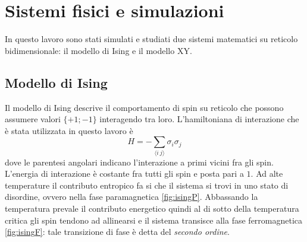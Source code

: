 \documentclass{article}
\begin{document}
\section{Sistemi fisici e simulazioni}
In questo lavoro sono stati simulati e studiati due sistemi matematici su reticolo bidimensionale:  il modello di Ising e il modello XY.
\subsection{Modello di Ising}
Il modello di Ising descrive il comportamento di spin su reticolo che possono assumere valori $\{+1;-1\}$ interagendo tra loro. L'hamiltoniana di interazione che è stata utilizzata in questo lavoro è
\begin{equation}
H=- \sum_{\langle i~j\rangle} \sigma_i\sigma_j
\end{equation} 
dove le parentesi angolari indicano l'interazione a primi vicini fra gli spin. L'energia di interazione è costante fra tutti gli spin e posta pari a $1$. Ad alte temperature il contributo entropico fa si che il sistema si trovi in uno stato di disordine, ovvero nella fase paramagnetica \ref{fig:isingP}. Abbassando la temperatura prevale il contributo energetico quindi al di sotto della temperatura critica gli spin tendono ad allinearsi e il sistema transisce alla fase ferromagnetica \ref{fig:isingF}: tale transizione di fase è detta del \emph{secondo ordine}.
\end{document}
